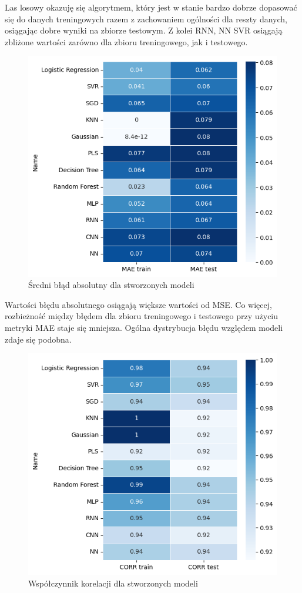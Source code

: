 Las losowy okazuję się algorytmem, który jest w stanie bardzo dobrze 
dopasować się do danych treningowych razem z zachowaniem ogólności dla 
reszty danych, osiągając dobre wyniki na zbiorze testowym. Z kolei RNN, NN
SVR osiągają zbliżone wartości zarówno dla zbioru treningowego, jak i testowego.

\begin{figure}[H]
    \centering
    \includegraphics[width=\textwidth]{images/mae.png}
    \caption{Średni błąd absolutny dla stworzonych modeli}
    \label{mae}
\end{figure}

Wartości błędu absolutnego osiągają większe wartości od MSE. Co więcej,
rozbieżność między błędem dla zbioru treningowego i testowego
przy użyciu metryki MAE staje się mniejsza. Ogólna dystrybucja błędu 
względem modeli zdaje się podobna.

\begin{figure}[H]
    \centering
    \includegraphics[width=\textwidth]{images/corr.png}
    \caption{Współczynnik korelacji dla stworzonych modeli}
    \label{corr}
\end{figure}

